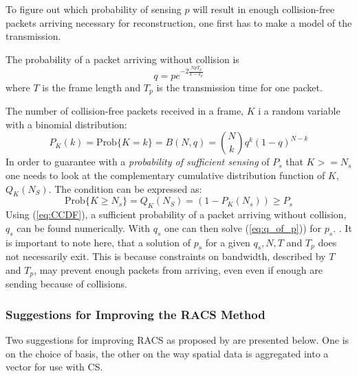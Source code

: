 \documentclass[Main]{subfiles}
\begin{document}
			To figure out which probability of sensing $p$ will result in enough collision-free packets arriving necessary for reconstruction, one first has to make a model of the transmission.

			The probability of a packet arriving without collision is
			\begin{equation}
				q = pe^{-2\frac{NpT_p}{T-T_p}}
				\label{eq:q_of_p} 
			\end{equation}
			where $T$ is the frame length and $T_p$ is the transmission time for one packet.

			The number of collision-free packets received in a frame, $K$ i a random variable with a binomial distribution:
			\begin{equation}
				P_K(k) = \text{Prob}\{K=k\} = B(N,q) =
					\binom{N}{k} q^k(1-q)^{N-k}
					\label{eq:BinomialModel}
			\end{equation}
			In order to guarantee with a \emph{probability of sufficient sensing} of $P_s$ that $K >= N_s$ one needs to look at the complementary cumulative distribution function of $K$, $Q_K(N_S)$.
			The condition can be expressed as:
			\begin{equation}
				\text{Prob}\{K \geq N_s\} = Q_K(N_S) = (1-P_K(N_s)) \geq P_s
				\label{eq:CCDF} 
			\end{equation}
			Using (\ref{eq:CCDF}), a sufficient probability of a packet arriving without collision, $q_s$ can be found numerically.
			With $q_s$ one can then solve (\ref{eq:q_of_p})) for $p_s$.
			.
			It is important to note here, that a solution of $p_s$ for a given $q_s, N, T$ and $T_p$ does not necessarily exit.
			This is because constraints on bandwidth, described by $T$ and $T_p$, may prevent enough packets from arriving, even even if enough are sending because of collisions.



		\subsubsection{Suggestions for Improving the RACS Method} %
		\label{sub:suggestions_for_improving_the_racs_method}

			Two suggestions for improving RACS as proposed by \cite{Fazel2011} are presented below.
			One is on the choice of basis, the other on the way spatial data is aggregated into a vector for use with CS.
\end{document}
